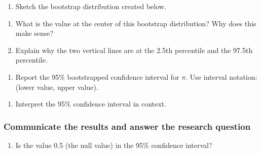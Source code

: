\documentclass[
]{report}
\providecommand{\tightlist}{%
  \setlength{\itemsep}{0pt}\setlength{\parskip}{0pt}}
\begin{document}
\begin{enumerate}
\def\labelenumi{\arabic{enumi}.}
\setcounter{enumi}{5}
\tightlist
\item
  Sketch the bootstrap distribution created below.
\end{enumerate}

\vspace{1.8in}

\begin{enumerate}
\def\labelenumi{\arabic{enumi}.}
\setcounter{enumi}{6}
\item
  What is the value at the center of this bootstrap distribution? Why does this make sense?
  \vspace{.8in}
\item
  Explain why the two vertical lines are at the 2.5th percentile and the 97.5th percentile.
\end{enumerate}

\vspace{.7in}

\begin{enumerate}
\def\labelenumi{\arabic{enumi}.}
\setcounter{enumi}{8}
\tightlist
\item
  Report the 95\% bootstrapped confidence interval for \(\pi\). Use interval notation: (lower value, upper value).
\end{enumerate}

\vspace{0.2in}

\begin{enumerate}
\def\labelenumi{\arabic{enumi}.}
\setcounter{enumi}{9}
\tightlist
\item
  Interpret the 95\% confidence interval in context.
\end{enumerate}

\vspace{.7in}

\hypertarget{communicate-the-results-and-answer-the-research-question-1}{%
\subsubsection*{Communicate the results and answer the research question}\label{communicate-the-results-and-answer-the-research-question-1}}

\begin{enumerate}
\def\labelenumi{\arabic{enumi}.}
\setcounter{enumi}{10}
\tightlist
\item
  Is the value 0.5 (the null value) in the 95\% confidence interval?
\end{enumerate}
\end{document}
